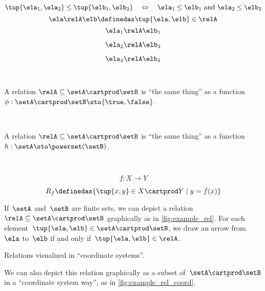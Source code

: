 {\begin{forslides}
        $$ \tup{\ela_1, \ela_2} \leq \tup{\elb_1, \elb_2} \quad \Leftrightarrow \quad \ela_1 \leq \elb_1 \text{ and } \ela_2 \leq \elb_2 \label{eq:slides-14}$$
        \begin{equation}
            \ela \relA \elb \definedas \tup{\ela, \elb} \in \relA  \label{eq:slides-15}
        \end{equation}
        $$ \ela_1 \relA \elb_1 \label{eq:slides-16}$$
        
        $$ \ela_2 \relA \elb_3 \label{eq:slides-17}$$
        
        $$ \ela_2 \relA \elb_4 \label{eq:slides-18}$$
        
        \
        
        A relation $\relA \subseteq \setA \cartprod \setB$ is ``the same thing'' as a function $\phi : \setA \cartprod \setB \sto \{\true, \false\}$.
        
        \
        
        
        A relation $\relA \subseteq \setA \cartprod \setB$ is ``the same thing'' as a function $h : \setA  \sto \powerset (\setB)$.
        
        \
        
        $$
        f : X \to Y
        $$
        
        
        $$
        R_f \definedas \{ \tup{x, y} \in X \cartprod Y \mid y = f(x) \}
        $$
    
    \end{forslides}
}


\begin{marginfigure}
    \centering
    \caption{}
    \label{fig:example_rel}
\end{marginfigure}

If~$\setA$ and~$\setB$ are finite sets, we can depict a relation~$\relA \subseteq \setA \cartprod \setB$ graphically as in \cref{fig:example_rel}.
For each element~$\tup{\ela,\elb} \in \setA \cartprod \setB$, we draw an arrow from~$\ela$ to~$\elb$ if and only if~$\tup{\ela,\elb} \in \relA$.


\begin{marginfigure}
    \centering
    \caption{Relations visualized in ``coordinate systems''.}
    \label{fig:example_rel_coord}
\end{marginfigure}

We can also depict this relation graphically as a subset of~$\setA \cartprod \setB$ in a ``coordinate system way'', as in \cref{fig:example_rel_coord}.

